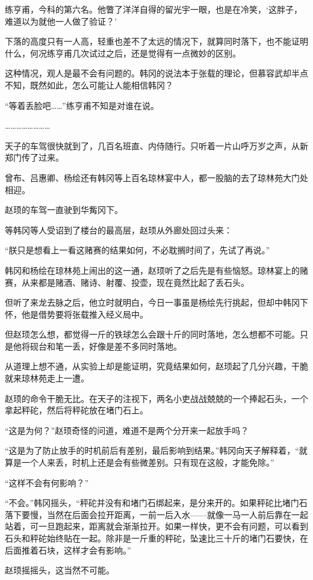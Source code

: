 练亨甫，今科的第六名。他瞥了洋洋自得的留光宇一眼，也是在冷笑，‘这胖子，难道以为就他一人做了验证？’

下落的高度只有一人高，轻重也差不了太远的情况下，就算同时落下，也不能证明什么，何况练亨甫几次试过之后，还是觉得有一点微妙的区别。

这种情况，观人是最不会有问题的。韩冈的说法本于张载的理论，但慕容武却半点不知，既然如此，怎么可能让人能相信韩冈？

“等着丢脸吧……”练亨甫不知是对谁在说。

……………………

天子的车驾很快就到了，几百名班直、内侍随行。只听着一片山呼万岁之声，从新郑门传了过来。

曾布、吕惠卿、杨绘还有韩冈等上百名琼林宴中人，都一股脑的去了琼林苑大门处相迎。

赵顼的车驾一直驶到华觜冈下。

等韩冈等人受诏到了楼台的最高层，赵顼从外廊处回过头来：

“朕只是想看上一看这赌赛的结果如何，不必耽搁时间了，先试了再说。”

韩冈和杨绘在琼林苑上闹出的这一通，赵顼听了之后先是有些恼怒。琼林宴上的赌赛，从来都是赌酒、赌诗、射覆、投壶，现在竟然比起了丢石头。

但听了来龙去脉之后，他立时就明白，今日一事虽是杨绘先行挑起，但却中韩冈下怀，他是借势要将张载推入经义局中。

但赵顼怎么想，都觉得一斤的铁球怎么会跟十斤的同时落地，怎么想都不可能。只是他将砚台和笔一丢，好像是差不多同时落地。

从道理上想不通，从实验上却是能证明，究竟结果如何，赵顼起了几分兴趣，干脆就来琼林苑走上一遭。

赵顼的命令干脆无比。在天子的注视下，两名小吏战战兢兢的一个捧起石头，一个拿起秤砣，然后将秤砣放在堵门石上。

“这是为何？”赵顼奇怪的问道，难道不是两个分开来一起放手吗？

“这是为了防止放手的时机前后有差别，最后影响到结果。”韩冈向天子解释着，“就算是一个人来丢，时机上还是会有些微差别。只有现在这般，才能免除。”

“这样不会有何影响？”

“不会。”韩冈摇头，“秤砣并没有和堵门石绑起来，是分来开的。如果秤砣比堵门石落下要慢，当然在后面会拉开距离，一前一后入水——就像一马一人前后靠在一起站着，可一旦跑起来，距离就会渐渐拉开。如果一样快，更不会有问题，可以看到石头和秤砣始终贴在一起。除非是一斤重的秤砣，坠速比三十斤的堵门石要快，在后面推着石块，这样才会有影响。”

赵顼摇摇头，这当然不可能。

